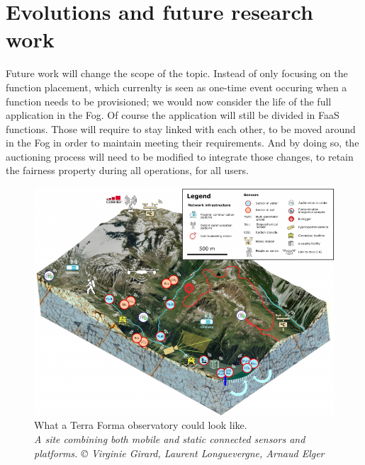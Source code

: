 \section{Evolutions and future research work}
\label{sec:evofurure}


Future work will change the scope of the topic. Instead of only focusing on the function placement, which currenlty is seen as one-time event occuring when a function needs to be provisioned; we would now consider the life of the full application in the Fog. Of course the application will still be divided in \gls{FaaS} functions. Those will require to stay linked with each other, to be moved around in the Fog in order to maintain meeting their requirements. And by doing so, the auctioning process will need to be modified to integrate those changes, to retain the fairness property during all operations, for all users.

\begin{figure}[H]
	\centering
	\includegraphics[width=1\textwidth]{./assets/terraforma.jpg}
	\caption[What a Terra Forma observatory could look like]{What a Terra Forma observatory could look like.\\
		\textit{A site combining both mobile and static connected sensors and platforms. © Virginie Girard, Laurent Longuevergne, Arnaud Elger}}
	\label{fig:terraforma}
\end{figure}

